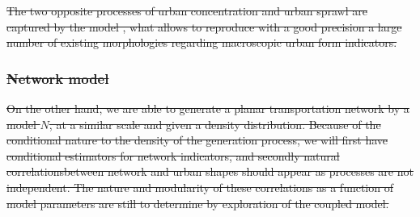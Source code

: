 \documentclass{bmcart}
\providecommand{\DIFdeltex}[1]{{\protect\color{red}\sout{#1}}}                      %
\providecommand{\DIFdel}[1]{\texorpdfstring{\DIFdeltex{#1}}{}} %
\begin{document}
\DIFdel{The two opposite processes of urban concentration and urban sprawl are captured by the model , what allows to reproduce with a good precision a large number of existing morphologies regarding macroscopic urban form indicators. }%

\subsubsection*{\DIFdel{Network model}}

\DIFdel{On the other hand, we are able to generate a planar transportation network by a model $N$, at a similar scale and given a density distribution. Because of the conditional nature to the density of the generation process, we will first have conditional estimators for network indicators, and secondly natural correlationsbetween network and urban shapes should appear as processes are not independent. The nature and modularity of these correlations as a function of model parameters are still to determine by exploration of the coupled model.
}%
\end{document}
